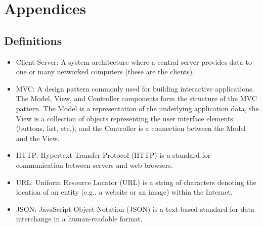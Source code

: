\documentclass{article}
\begin{document}
\newpage
\section{Appendices}
\subsection{Definitions}
\begin{itemize}
\item Client-Server: A system architecture where a central server provides data to one or many networked computers (these are the clients).
\item MVC: A design pattern commonly used for building interactive applications. The Model, View, and Controller components form the structure of the MVC pattern. The Model is a representation of  the underlying application data, the  View is a collection of objects representing the user interface elements (buttons, list, etc.), and the Controller is a connection between the Model and the View.
\item HTTP: Hypertext Transfer Protocol (HTTP) is a standard for communication between servers and web browsers.
\item URL: Uniform Resource Locator (URL) is a string of characters denoting the location of an entity (e.g., a website or an image) within the Internet.
\item JSON: JavaScript Object Notation (JSON) is a text-based standard for data interchange in a human-readable format.
\end{itemize}
\end{document}

